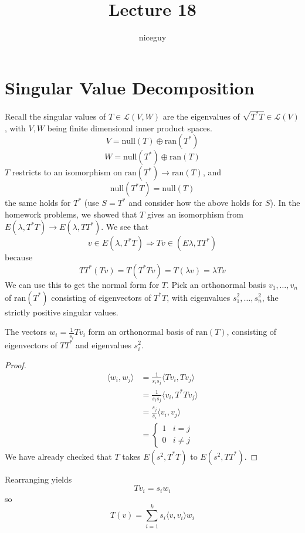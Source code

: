 \documentclass[12pt]{article}
\author{niceguy}
\title{Lecture 18}
\begin{document}
\maketitle

\section{Singular Value Decomposition}

Recall the singular values of $T \in \mathcal L(V,W)$ are the eigenvalues of $\sqrt{T^*T} \in \mathcal L(V)$, with $V,W$ being finite dimensional inner product spaces.
$$V = \text{null}(T) \oplus \text{ran}(T^*)$$
$$W = \text{null}(T^*) \oplus \text{ran}(T)$$
$T$ restricts to an isomorphism on $\text{ran}(T^*) \rightarrow \text{ran}(T)$, and
$$\text{null}(T^*T) = \text{null}(T)$$
the same holds for $T^*$ (use $S=T^*$ and consider how the above holds for $S$). In the homework problems, we showed that $T$ gives an isomorphism from $E(\lambda,T^*T) \rightarrow E(\lambda,TT^*)$. We see that
$$v \in E(\lambda,T^*T) \Rightarrow Tv \in (E\lambda,TT^*)$$
because
$$TT^*(Tv) = T(T^*Tv) = T(\lambda v) = \lambda Tv$$
We can use this to get the normal form for $T$. Pick an orthonormal basis $v_1,\dots,v_n$ of $\text{ran}(T^*)$ consisting of eigenvectors of $T^*T$, with eigenvalues $s_1^2,\dots,s_n^2$, the strictly positive singular values.

\begin{lem}
	The vectors $w_i = \frac{1}{s_i}Tv_i$ form an orthonormal basis of $\text{ran}(T)$, consisting of eigenvectors of $TT^*$ and eigenvalues $s_i^2$.
\end{lem}

\begin{proof}
	\begin{align*}
		\langle w_i,w_j \rangle &= \frac{1}{s_is_j} \langle Tv_i,Tv_j \rangle \\
					&= \frac{1}{s_is_j} \langle v_i,T^*Tv_j \rangle \\
					&= \frac{s_j}{s_i} \langle v_i,v_j \rangle \\
					&= \begin{cases} 1 & i = j \\ 0 & i \neq j \end{cases}
	\end{align*}
	We have already checked that $T$ takes $E(s^2,T^*T)$ to $E(s^2,TT^*)$.
\end{proof}

Rearranging yields
$$Tv_i = s_iw_i$$
so
$$T(v) = \sum_{i=1}^k s_i \langle v,v_i \rangle w_i$$
\end{document}
